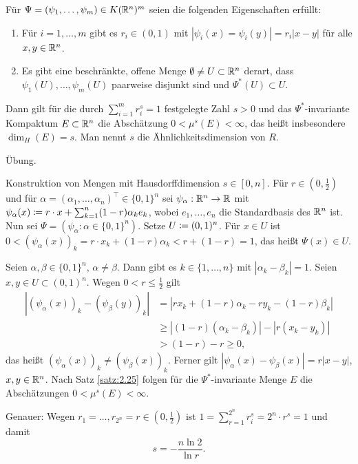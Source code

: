 \documentclass[a4paper,twoside,DIV15,BCOR12mm]{scrbook}
\begin{document}
\begin{satz}[Hutchinson, 1981]
\label{satz:2.25}
Für $\Psi= (\psi_1,\ldots,\psi_m)\in K(\mathbb{R}^n)^m$ seien die folgenden Eigenschaften erfüllt:
\begin{enumerate}
\item Für $i=1,\ldots,m$ gibt es $r_i\in(0,1)$ mit $|\psi_i(x) = \psi_i(y)| = r_i|x-y|$ für alle $x,y\in\mathbb{R}^n$.
\item Es gibt eine beschränkte, offene Menge $\emptyset \ne U\subset\mathbb{R}^n$ derart, dass $\psi_1(U),\ldots,\psi_m(U)$ paarweise disjunkt sind und $\Psi^*(U) \subset U$.
\end{enumerate}
Dann gilt für die durch $\sum_{i=1}^m r_i^s = 1$ festgelegte Zahl $s>0$ und das $\Psi^*$-invariante Kompaktum $E\subset \mathbb{R}^n$ die Abschätzung $0<\mu^s(E) < \infty$, das heißt insbesondere $\dim_H(E)= s$. Man nennt $s$ die Ähnlichkeitsdimension von $R$.
\end{satz}

\begin{beweis}
Übung.
\end{beweis}

Konstruktion von Mengen mit Hausdorffdimension $s\in[0,n]$. Für $r\in(0,\frac12)$ und für $\alpha=(\alpha_1,\ldots,\alpha_n)^\top\in\{0,1\}^n$ sei $\psi_\alpha : \mathbb{R}^n \to \mathbb{R}$ mit $\psi_\alpha(x) \da r\cdot x + \sum_{k=1}^n (1-r)\alpha_ke_k$, wobei $e_1,\ldots,e_n$ die Standardbasis des $\mathbb{R}^n$ ist. Nun sei $\Psi=(\psi_\alpha: \alpha\in\{0,1\}^n)$. Setze $U\da (0,1)^n$. Für $x\in U$ ist $0 < (\psi_\alpha(x))_k = r\cdot x_k + (1-r)\alpha_k < r + (1-r) = 1$, das heißt $\Psi(x) \in U$.

Seien $\alpha,\beta \in\{0,1\}^n$, $\alpha \ne \beta$. Dann gibt es $k\in\{1,\ldots,n\}$ mit $|\alpha_k - \beta_k| = 1$. Seien $x,y\in U\subset (0,1)^n$. Wegen $0<r\le \frac12$ gilt
\begin{align*}
|(\psi_\alpha(x))_k - (\psi_\beta(y))_k|
&= |rx_k + (1-r)\alpha_k - ry_k - (1-r)\beta_k|\\
&\ge |(1-r)(\alpha_k - \beta_k)| - |r(x_k-y_k)|\\
&> (1-r) - r \ge 0,
\end{align*}
das heißt $(\psi_\alpha(x))_k \ne (\psi_\beta(x))_k$. Ferner gilt $|\psi_\alpha(x) - \psi_\beta(x)| = r |x-y|$, $x,y\in \mathbb{R}^n$.  Nach Satz \ref{satz:2.25} folgen für die $\Psi^*$-invariante Menge $E$ die Abschätzungen $0<\mu^s(E)<\infty$. 

Genauer: Wegen $r_1=\ldots,r_{2^n}=r\in(0,\frac12)$ ist $1 = \sum_{r=1}^{2^n} r_i^s = 2^n \cdot r^s = 1$ und damit
\[
s = -\frac{n \ln 2}{\ln r}.
\]
\end{document}
